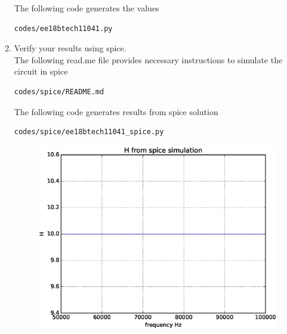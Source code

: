 \begin{enumerate}[label=\arabic*.,ref=\theenumi]
%
% 

    
The following code generates the values
\begin{lstlisting}
codes/ee18btech11041.py
\end{lstlisting}

\item Verify your results using spice.
\\
\solution
The following read.me file provides necessary instructions to simulate the circuit in spice

\begin{lstlisting}
codes/spice/README.md
\end{lstlisting}

The following code generates results from spice solution

\begin{lstlisting}
codes/spice/ee18btech11041_spice.py
\end{lstlisting}

\begin{figure}[!ht]
\centering
\includegraphics[width=\columnwidth]{./figs/H1.eps}
\caption{}
\label{fig:ee18btech11041_fig8}
\end{figure}



\end{enumerate}
